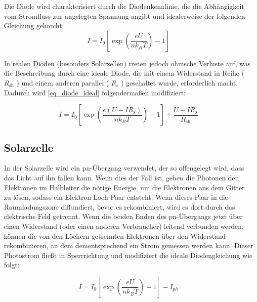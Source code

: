 \documentclass[
	a4paper,
	12pt,
	pagesize,
	ngerman
]{scrartcl}
\begin{document}
	Die Diode wird charakterisiert durch die Diodenkennlinie, die die Abhängigkeit vom Stromfluss zur angelegten Spannung angibt und idealerweise der folgenden Gleichung gehorcht:
	\begin{equation}
		\label{eq_diode_ideal}
		I = I_0 \left[ \exp \left( \frac{eU}{n k_B T} \right) -1 \right] %
	\end{equation}

	In realen Dioden (besonders Solarzellen) treten jedoch ohmsche Verluste auf, was die Beschreibung durch eine ideale Diode, die mit einem Widerstand in Reihe ( $ R_\text{sh} $ ) und einem anderen parallel ( $ R_\text{s} $ ) geschaltet wurde, erforderlich macht.
	Dadurch wird \cref{eq_diode_ideal} folgendermaßen modifiziert:

	\begin{equation}
		\label{eq_diode_real}
		I = I_0 \left[ \exp \left( \frac{e (U-I R_\text{s})}{n k_B T} \right) -1 \right] + \frac{U-I R_\text{s}}{R_\text{sh}}%
	\end{equation}

	\subsection{Solarzelle}

	In der Solarzelle wird ein pn-Übergang verwendet, der so offengelegt wird, dass das Licht auf ihn fallen kann.
	Wenn dies der Fall ist, geben die Photonen den Elektronen im Halbleiter die nötige Energie, um die Elektronen aus dem Gitter zu lösen, sodass ein Elektron-Loch-Paar entsteht.
	Wenn dieses Paar in die Raumladungszone diffundiert, bevor es rekombiniert, wird es dort durch das elektrische Feld getrennt.
	Wenn die beiden Enden des pn-Übergangs jetzt über einen Widerstand (oder einen anderen Verbraucher) leitend verbunden werden, können die von den Löchern getrennten Elektronen über den Widerstand rekombinieren, an dem dementsprechend ein Strom gemessen werden kann.
	Dieser Photostrom fließt in Sperrrichtung und modifiziert die ideale Diodengleichung \label{eq_diode_real} wie folgt:

	\begin{equation}
			\label{eq_photostrom}
			I = I_0 \left[\exp{\left(\frac{eU}{n k_B T}\right)}-1\right]-I_{ph}
	\end{equation}
\end{document}
